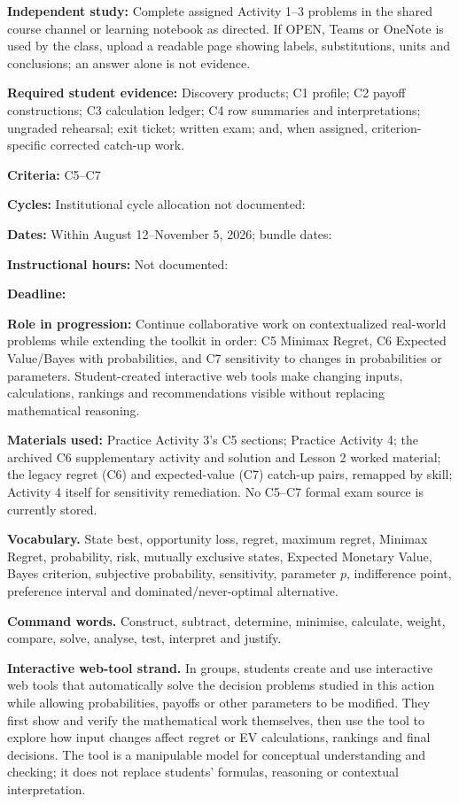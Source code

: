 \documentclass[10pt,letterpaper]{article}
\newcommand{\labelled}[2]{\textbf{#1:} #2\par}
\newcommand{\plansubsection}[1]{\Needspace{7\baselineskip}\par\vspace{5pt}{\normalsize\bfseries #1\par}\vspace{1pt}}
\begin{document}
\labelled{Independent study}{Complete assigned Activity 1--3 problems in the shared course channel or learning notebook as directed. If OPEN, Teams or OneNote is used by the class, upload a readable page showing labels, substitutions, units and conclusions; an answer alone is not evidence.}
\labelled{Required student evidence}{Discovery products; C1 profile; C2 payoff constructions; C3 calculation ledger; C4 row summaries and interpretations; ungraded rehearsal; exit ticket; written exam; and, when assigned, criterion-specific corrected catch-up work.}

\plansubsection{Pedagogical Action N2---Regret, Expected Value and Probability Sensitivity}

\labelled{Criteria}{C5--C7}
\labelled{Cycles}{Institutional cycle allocation not documented: \underline{\hspace{2.2in}}}
\labelled{Dates}{Within August 12--November 5, 2026; bundle dates: \underline{\hspace{2.1in}}}
\labelled{Instructional hours}{Not documented: \underline{\hspace{1.6in}}}
\labelled{Deadline}{\underline{\hspace{3in}}}
\labelled{Role in progression}{Continue collaborative work on contextualized real-world problems while extending the toolkit in order: C5 Minimax Regret, C6 Expected Value/Bayes with probabilities, and C7 sensitivity to changes in probabilities or parameters. Student-created interactive web tools make changing inputs, calculations, rankings and recommendations visible without replacing mathematical reasoning.}
\labelled{Materials used}{Practice Activity 3's C5 sections; Practice Activity 4; the archived C6 supplementary activity and solution and Lesson 2 worked material; the legacy regret (C6) and expected-value (C7) catch-up pairs, remapped by skill; Activity 4 itself for sensitivity remediation. No C5--C7 formal exam source is currently stored.}

\textbf{Vocabulary.} State best, opportunity loss, regret, maximum regret,
Minimax Regret, probability, risk, mutually exclusive states, Expected Monetary
Value, Bayes criterion, subjective probability, sensitivity, parameter $p$,
indifference point, preference interval and dominated/never-optimal alternative.

\textbf{Command words.} Construct, subtract, determine, minimise, calculate,
weight, compare, solve, analyse, test, interpret and justify.

\textbf{Interactive web-tool strand.} In groups, students create and use
interactive web tools that automatically solve the decision problems studied
in this action while allowing probabilities, payoffs or other parameters to be
modified. They first show and verify the mathematical work themselves, then
use the tool to explore how input changes affect regret or EV calculations,
rankings and final decisions. The tool is a manipulable model for conceptual
understanding and checking; it does not replace students' formulas, reasoning
or contextual interpretation.
\end{document}
